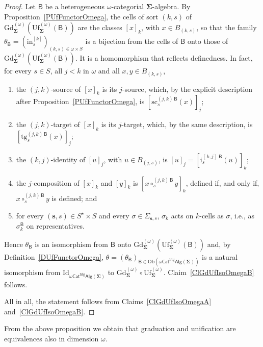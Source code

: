 \documentclass[a4paper, reqno]{amsbook}
\newcommand{\sig}[1]{\mathbf{#1}}             %
\newcommand{\calg}[1]{\boldsymbol{\mathsf{#1}}} %
\newcommand{\htg}{\mathrm{htg}}                %
\newcommand{\Id}{\mathrm{Id}}
\newcommand{\src}{\mathrm{sc}}
\newcommand{\tgt}{\mathrm{tg}}
\newcommand{\Gd}{\mathrm{Gd}}
\newcommand{\Uf}{\mathrm{Uf}}
\theoremstyle{plain}
\theoremstyle{definition}
\begin{document}
\begin{proof}
Let $\calg{B}$ be a heterogeneous $\omega$-categorial $\sig{\Sigma}$-algebra.
By Proposition~\ref{PUfFunctorOmega}, the cells of sort $(k,s)$ of $\Gd^{(\omega)}_{\sig{\Sigma}}(\Uf^{(\omega)}_{\sig{\Sigma}}(\calg{B}))$ are the classes $[x]_{k}$, with $x\in B_{(k,s)}$, so that the family $\theta_{\calg{B}}=(\mathrm{in}^{[k]}_{s})_{(k,s)\in\omega\times S}$ is a bijection from the cells of $\calg{B}$ onto those of $\Gd^{(\omega)}_{\sig{\Sigma}}(\Uf^{(\omega)}_{\sig{\Sigma}}(\calg{B}))$.
It is a homomorphism that reflects definedness.
In fact, for every $s\in S$, all $j<k$ in $\omega$ and all $x,y\in B_{(k,s)}$,
\begin{enumerate}
\item the $(j,k)$-source of $[x]_{k}$ is its $j$-source, which, by the explicit description after Proposition~\ref{PUfFunctorOmega}, is $[\src^{(j,k)\,\calg{B}}_{s}(x)]_{j}$;
\item the $(j,k)$-target of $[x]_{k}$ is its $j$-target, which, by the same description, is $[\tgt^{(j,k)\,\calg{B}}_{s}(x)]_{j}$;
\item the $(k,j)$-identity of $[u]_{j}$, with $u\in B_{(j,s)}$, is $[u]_{j}=[\mathrm{i}^{(k,j)\,\calg{B}}_{s}(u)]_{k}$;
\item the $j$-composition of $[x]_{k}$ and $[y]_{k}$ is $[x\circ^{(j,k)\,\calg{B}}_{s}y]_{k}$, defined if, and only if, $x\circ^{(j,k)\,\calg{B}}_{s}y$ is defined; and
\item for every $(\mathbf{s},s)\in S^{\star}\times S$ and every $\sigma\in\Sigma_{\mathbf{s},s}$, $\sigma_{k}$ acts on $k$-cells as $\sigma$, i.e., as $\sigma^{\calg{B}}_{k}$ on representatives.
\end{enumerate}
Hence $\theta_{\calg{B}}$ is an isomorphism from $\calg{B}$ onto $\Gd^{(\omega)}_{\sig{\Sigma}}(\Uf^{(\omega)}_{\sig{\Sigma}}(\calg{B}))$ and, by Definition~\ref{DUfFunctorOmega}, $\theta=(\theta_{\calg{B}})_{\calg{B}\in\mathrm{Ob}(\omega\mathsf{Cat}^{\htg}\mathsf{Alg}(\sig{\Sigma}))}$ is a natural isomorphism from $\Id_{\omega\mathsf{Cat}^{\htg}\mathsf{Alg}(\sig{\Sigma})}$ to $\Gd^{(\omega)}_{\sig{\Sigma}}\circ\Uf^{(\omega)}_{\sig{\Sigma}}$.
Claim~\ref{ClGdUfIsoOmegaB} follows.

All in all, the statement follows from Claims~\ref{ClGdUfIsoOmegaA} and~\ref{ClGdUfIsoOmegaB}.
\end{proof}

From the above proposition we obtain that graduation and unification are equivalences also in dimension $\omega$.
\end{document}
